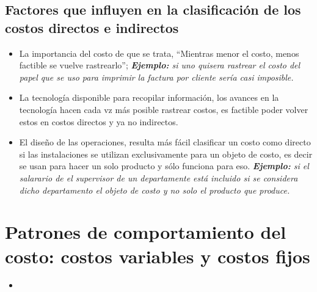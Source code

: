 \documentclass{article}
\begin{document}
\subsection{Factores que influyen en la clasificación de los costos directos e indirectos}
\begin{itemize}
    \item La importancia del costo de que se trata, ``Mientras menor el costo, menos factible se vuelve rastrearlo''; \emph{\textbf{Ejemplo: }si uno quisera rastrear el costo del papel que se uso para imprimir la factura por cliente sería casi imposible.}
    \item La tecnología disponible para recopilar información, los avances en la tecnología hacen cada vz más posible rastrear costos, es factible poder volver estos en costos directos y ya no indirectos.
    \item El diseño de las operaciones, resulta más fácil clasificar un costo como directo si las instalaciones se utilizan exclusivamente para un objeto de costo, es decir se usan para hacer un solo producto y sólo funciona para eso. \emph{\textbf{Ejemplo: }si el salarario de el supervisor de un departamente está incluido si se considera dicho departamento el objeto de costo y no solo el producto que produce.}
\end{itemize}

\section{Patrones de comportamiento del costo: costos variables y costos fijos}
\begin{itemize}
    \item 
\end{itemize}
\end{document}
